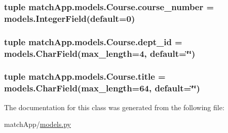 \subsubsection[{course\+\_\+number}]{\setlength{\rightskip}{0pt plus 5cm}tuple match\+App.\+models.\+Course.\+course\+\_\+number = models.\+Integer\+Field(default=0)\hspace{0.3cm}{\ttfamily [static]}}\label{classmatch_app_1_1models_1_1_course_a1362cefc0918c4ac31f33c4f76197336}
\hypertarget{classmatch_app_1_1models_1_1_course_a1ed41be5dd960488ff6fe01eb27074f0}{}
\subsubsection[{dept\+\_\+id}]{\setlength{\rightskip}{0pt plus 5cm}tuple match\+App.\+models.\+Course.\+dept\+\_\+id = models.\+Char\+Field(max\+\_\+length=4, default=\char`\"{}\char`\"{})\hspace{0.3cm}{\ttfamily [static]}}\label{classmatch_app_1_1models_1_1_course_a1ed41be5dd960488ff6fe01eb27074f0}
\hypertarget{classmatch_app_1_1models_1_1_course_afaa80992df56f2f15372c2c523b081c5}{}
\subsubsection[{title}]{\setlength{\rightskip}{0pt plus 5cm}tuple match\+App.\+models.\+Course.\+title = models.\+Char\+Field(max\+\_\+length=64, default=\char`\"{}\char`\"{})\hspace{0.3cm}{\ttfamily [static]}}\label{classmatch_app_1_1models_1_1_course_afaa80992df56f2f15372c2c523b081c5}


The documentation for this class was generated from the following file\+:\begin{DoxyCompactItemize}
\item 
match\+App/\hyperlink{models_8py}{models.\+py}\end{DoxyCompactItemize}
